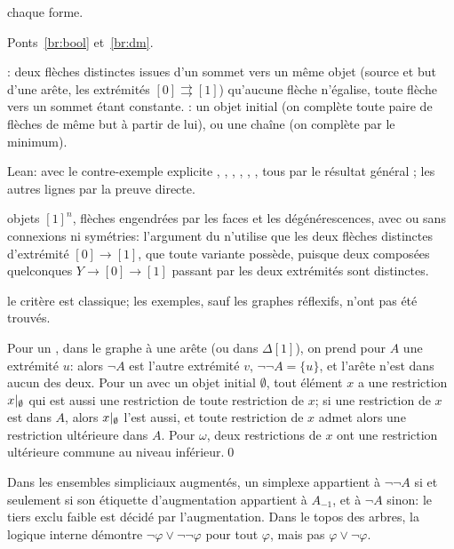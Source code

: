 \begin{trace}
\item[tablier] chaque forme.
\item[arche] Ponts~\ref{br:bool} et~\ref{br:dm}.
\item[spécialiser] : deux flèches distinctes issues d'un sommet vers un même objet (source et but d'une arête, les extrémités $[0]\rightrightarrows[1]$) qu'aucune flèche n'égalise, toute flèche vers un sommet étant constante. : un objet initial (on complète toute paire de flèches de même but à partir de lui), ou une chaîne (on complète par le minimum).
\item[vérifier] Lean:  avec le contre-exemple explicite , , , , , , tous par le résultat général ; les autres lignes par la preuve directe.
\item[cubes] objets $[1]^n$, flèches engendrées par les faces et les dégénérescences, avec ou sans connexions ni symétries: l'argument du  n'utilise que les deux flèches distinctes d'extrémité $[0]\to[1]$, que toute variante possède, puisque deux composées quelconques $Y\to[0]\to[1]$ passant par les deux extrémités sont distinctes.
\item[nouveauté] le critère est classique; les exemples, sauf les graphes réflexifs, n'ont pas été trouvés.
\end{trace}

\direct{} Pour un , dans le graphe à une arête (ou dans $\Delta[1]$), on prend pour $A$ une extrémité $u$: alors $\neg A$ est l'autre extrémité $v$, $\neg\neg A = \{u\}$, et l'arête n'est dans aucun des deux. Pour un  avec un objet initial $\emptyset$, tout élément $x$ a une restriction $x|_{\emptyset}$ qui est aussi une restriction de toute restriction de $x$; si une restriction de $x$ est dans $A$, alors $x|_{\emptyset}$ l'est aussi, et toute restriction de $x$ admet alors une restriction ultérieure dans $A$. Pour $\omega$, deux restrictions de $x$ ont une restriction ultérieure commune au niveau inférieur.\qed

\begin{example}
Dans les ensembles simpliciaux augmentés, un simplexe appartient à $\neg\neg A$ si et seulement si son étiquette d'augmentation appartient à $A_{-1}$, et à $\neg A$ sinon: le tiers exclu faible est décidé par l'augmentation. Dans le topos des arbres, la logique interne démontre $\neg\varphi\vee\neg\neg\varphi$ pour tout $\varphi$, mais pas $\varphi\vee\neg\varphi$.
\end{example}
